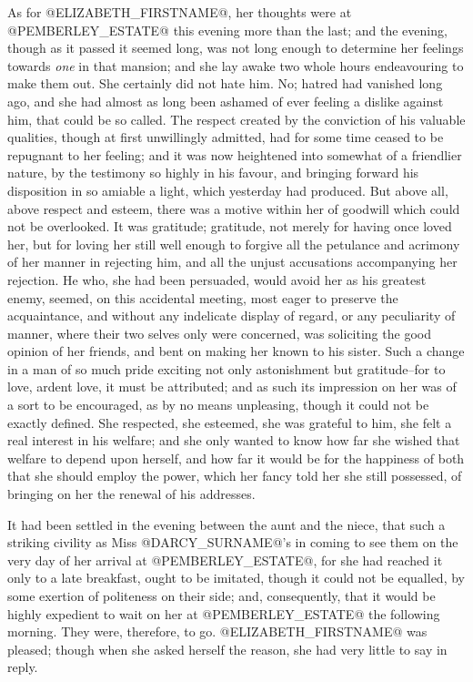 As for @ELIZABETH_FIRSTNAME@, her thoughts were at @PEMBERLEY_ESTATE@ this evening more than
the last; and the evening, though as it passed it seemed long, was not
long enough to determine her feelings towards \textit{one} in that mansion;
and she lay awake two whole hours endeavouring to make them out. She
certainly did not hate him. No; hatred had vanished long ago, and she
had almost as long been ashamed of ever feeling a dislike against him,
that could be so called. The respect created by the conviction of his
valuable qualities, though at first unwillingly admitted, had for some
time ceased to be repugnant to her feeling; and it was now heightened
into somewhat of a friendlier nature, by the testimony so highly in
his favour, and bringing forward his disposition in so amiable a light,
which yesterday had produced. But above all, above respect and esteem,
there was a motive within her of goodwill which could not be overlooked.
It was gratitude; gratitude, not merely for having once loved her,
but for loving her still well enough to forgive all the petulance and
acrimony of her manner in rejecting him, and all the unjust accusations
accompanying her rejection. He who, she had been persuaded, would avoid
her as his greatest enemy, seemed, on this accidental meeting, most
eager to preserve the acquaintance, and without any indelicate display
of regard, or any peculiarity of manner, where their two selves only
were concerned, was soliciting the good opinion of her friends, and bent
on making her known to his sister. Such a change in a man of so much
pride exciting not only astonishment but gratitude--for to love, ardent
love, it must be attributed; and as such its impression on her was of a
sort to be encouraged, as by no means unpleasing, though it could not be
exactly defined. She respected, she esteemed, she was grateful to him,
she felt a real interest in his welfare; and she only wanted to know how
far she wished that welfare to depend upon herself, and how far it would
be for the happiness of both that she should employ the power, which her
fancy told her she still possessed, of bringing on her the renewal of
his addresses.

It had been settled in the evening between the aunt and the niece, that
such a striking civility as Miss @DARCY_SURNAME@'s in coming to see them on the
very day of her arrival at @PEMBERLEY_ESTATE@, for she had reached it only to a
late breakfast, ought to be imitated, though it could not be equalled,
by some exertion of politeness on their side; and, consequently, that
it would be highly expedient to wait on her at @PEMBERLEY_ESTATE@ the following
morning. They were, therefore, to go. @ELIZABETH_FIRSTNAME@ was pleased; though when
she asked herself the reason, she had very little to say in reply.


